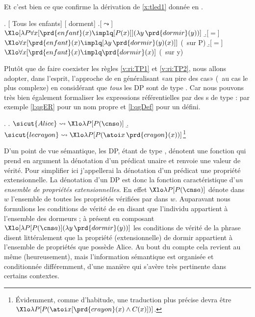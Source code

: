 Et c'est bien ce que confirme la dérivation de \ref{x:tled1} donnée en \Next.

\ex.
[ Tous les enfants] [ dorment] 
\a.[$\leadsto$] \(\Xlo[\lambda P\forall x [\prd{enfant}(x)\implq[P(x)]](\lambda y\,\prd{dormir}(y))]\)
\b.[$=$] \(\Xlo\forall x [\prd{enfant}(x)\implq[\lambda y\,\prd{dormir}(y)(x)]]\) \hfill (\breduc\ sur \vrb P)
\b.[$=$] \(\Xlo\forall x [\prd{enfant}(x)\implq\prd{dormir}(x)]\)
\hfill (\breduc\ sur \vrb y)


Plutôt que de faire coexister les règles \ref{v:ri:TP1} et \ref{v:ri:TP2}, nous allons adopter, dans l'esprit, l'approche de \citet{PTQ} en généralisant «au pire des cas» (\ie\ au cas le plus complexe) en considérant que \emph{tous} les DP sont de type \ett. 
Car nous pouvons très bien également formaliser les expressions référentielles par des \lterme s de type {\ett} : par exemple \ref{l:qgER} pour un nom propre et \ref{l:qgDef} pour un défini. 

\ex.
\a. \(\sicut{Alice} \leadsto \Xlo\lambda P [P(\cns a)]\)\label{l:qgER}
\b. \(\sicut{le crayon} \leadsto \Xlo\lambda P [P(\atoi x\,\prd{crayon}(x))]\)\label{l:qgDef}\footnote{Évidemment, comme d'habitude, une traduction plus précise devra être \(\Xlo\lambda P [P(\atoi x[\prd{crayon}(x)\wedge C(x)])]\).}


D'un point de vue sémantique, les DP, étant de type \ett, dénotent une fonction qui prend en argument la dénotation d'un prédicat unaire et renvoie une valeur de vérité.  Pour simplifier ici j'appellerai la dénotation d'un prédicat une propriété extensionnelle.  La dénotation d'un DP est donc la fonction caractéristique d'\emph{un ensemble de propriétés extensionnelles}.
En effet \(\Xlo\lambda P [P(\cns a)]\) dénote dans $w$ l'ensemble de toutes les propriétés vérifiées par  dans $w$.  
Auparavant nous formulions les conditions de vérité de  en disant que l'individu  appartient à l'ensemble des dormeurs ; à présent en composant \(\Xlo[\lambda P [P(\cns a)](\lambda y\,\prd{dormir}(y))]\)\label{p.PaV} les conditions de vérité de la phrase disent littéralement que la propriété (extensionnelle) de dormir appartient à l'ensemble de propriétés que possède Alice. 
Au bout du compte cela revient au même (heureusement), mais l'information sémantique est organisée et conditionnée différemment, d'une manière qui s'avère très pertinente dans certains contextes. 

